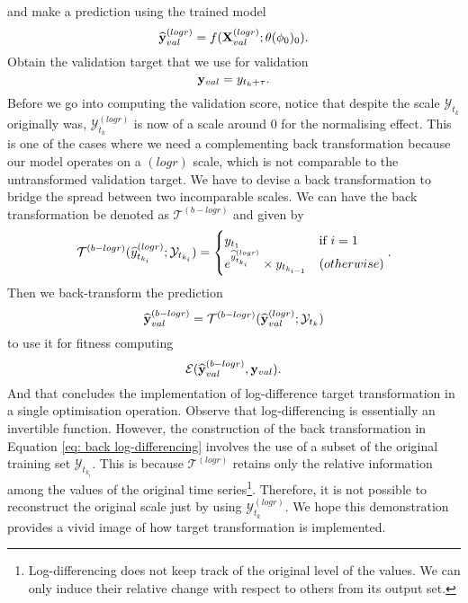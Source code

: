 and make a prediction using the trained model
\begin{equation*}
    \widehat{\mathbf{y}}^{(logr)}_{val} = f(\mathbf{X}^{(logr)}_{val} ; \theta(\phi_0)_0).
\end{equation*}
Obtain the validation target that we use for validation
\begin{equation*}
    \mathbf{y}_{val} = y_{t_k + \tau}.
\end{equation*}
Before we go into computing the validation score, notice that despite the scale $\mathcal{Y}_{t_k}$ originally was, $\mathcal{Y}^{(logr)}_{t_k}$ is now of a scale around $0$ for the normalising effect. This is one of the cases where we need a complementing back transformation because our model operates on a $(logr)$ scale, which is not comparable to the untransformed validation target. We have to devise a back transformation to bridge the spread between two incomparable scales. We can have the back transformation be denoted as $\mathcal{T}^{(b-logr)}$ and given by
\begin{equation}\label{eq: back log-differencing}
    \mathcal{T}^{(b-logr)}(\widehat{y}^{(logr)}_{t_{k_i}} ;\mathcal{Y}_{t_{k_i}}) =
    \begin{cases}
        y_{t_1}                                                   &\text{if $i = 1$} \\
        e^{\widehat{y}^{(logr)}_{t_{k_i}}} \times y_{t_{k_{i-1}}} &\text(otherwise)
    \end{cases}.
\end{equation}
Then we back-transform the prediction
\begin{equation*}
    \widehat{\mathbf{y}}^{(b-logr)}_{val} = \mathcal{T}^{(b-logr)}(\widehat{\mathbf{y}}^{(logr)}_{val} ;\mathcal{Y}_{t_k})
\end{equation*}
to use it for fitness computing
\begin{equation*}
    \mathcal{E}(\widehat{\mathbf{y}}^{(b-logr)}_{val}, \mathbf{y}_{val}).
\end{equation*}
And that concludes the implementation of log-difference target transformation in a single optimisation operation. Observe that log-differencing is essentially an invertible function. However, the construction of the back transformation in Equation \ref{eq: back log-differencing} involves the use of a subset of the original training set $\mathcal{Y}_{t_{k_i}}$. This is because $\mathcal{T}^{(logr)}$ retains only the relative information among the values of the original time series\footnote{Log-differencing does not keep track of the original level of the values. We can only induce their relative change with respect to others from its output set.}. Therefore, it is not possible to reconstruct the original scale just by using $\mathcal{Y}^{(logr)}_{t_k}$. We hope this demonstration provides a vivid image of how target transformation is implemented.


